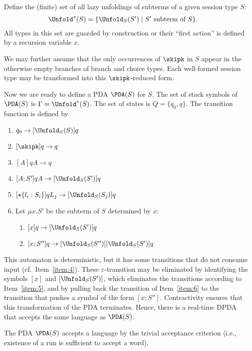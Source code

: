 Define the (finite) set of all lazy unfoldings of subterms of a given session type $S$:
\begin{align*}
  \Unfold^* (S)& = \{ \Unfold_S (S') \mid S' \text{ subterm of }S \}.  
\end{align*}
All types in this set are guarded by construction or their ``first action'' is defined by a
recursion variable $x$.

We may further assume that the only occurrences of $\skipk$ in $S$ appear in the otherwise empty branches
of branch and choice types. Each well-formed session type may be transformed into this $\skipk$-reduced form.


Now we are ready to define a PDA $\PDA(S)$ for $S$.
The set of stack symbols of $\PDA (S)$ is $\Gamma = \Unfold^* (S)$.
The set of states is $Q = \{ q_0, q \}$.
The transition function is defined by
\begin{enumerate}
\item $q_0 \to [\Unfold_S (S)] q$
\item $[\skipk] q \to q$
\item $[A] q A \to q$
\item $[A;S'] q A \to [\Unfold_S (S')] q$
\item $[\star\{l_i:S_i\}] q L_j \to [\Unfold_S (S_j)] q$
\item\label{item:4} Let  $\mu x.S'$ be the subterm of $S$  determined by $x$:
  \begin{enumerate}
  \item\label{item:5} $[x] q \to [\Unfold_S(S')] q$ 
  \item\label{item:6} $[x; S''] q \to [\Unfold_S (S'')][\Unfold_S(S')] q$ 
  \end{enumerate}
\end{enumerate}

This automaton is deterministic, but it has some transitions that do not consume input (cf.\ Item~\ref{item:4}). These
$\varepsilon$-transition may be eliminated by identifying the symbols $[x]$ and $[\Unfold_S(S')]$,
which eliminates the transitions according to Item~\ref{item:5}, and by pulling back the transition
of Item~\ref{item:6} to the transition that pushes a symbol of the form $[x; S'']$. Contractivity
ensures that this transformation of the PDA terminates. Hence, there is a real-time DPDA that
accepts the same language as $\PDA (S)$.

The PDA $\PDA (S)$ accepts a language by the trivial acceptance criterion (i.e., existence of a run is
sufficient to accept a word).

